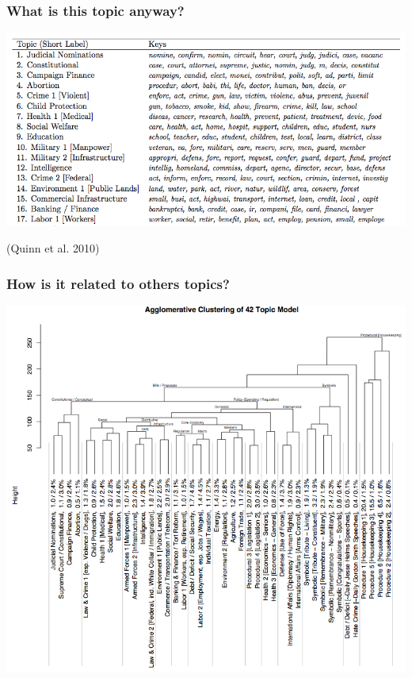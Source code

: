 \documentclass[11pt,compress,professionalfonts]{beamer}
\begin{document}
\begin{frame}[t]\frametitle{What is this topic anyway?}

\centerline{\includegraphics[scale=.8]{pictures/topic-words}}

{\footnotesize (Quinn et al. 2010)}

\end{frame}
\begin{frame}[t]\frametitle{How is it related to others topics?}

\centerline{\includegraphics[scale=.55]{pictures/topic-clustering}}

\end{frame}
\end{document}
